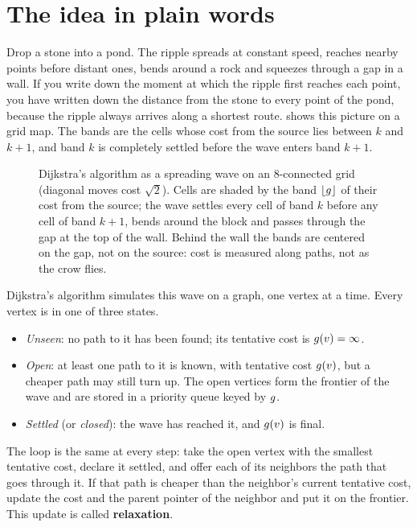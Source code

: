 \section{The idea in plain words}
\label{sec:ch03-intuition}

Drop a stone into a pond. The ripple spreads at constant speed, reaches nearby points before
distant ones, bends around a rock and squeezes through a gap in a wall. If you write down the
moment at which the ripple first reaches each point, you have written down the distance from the
stone to every point of the pond, because the ripple always arrives along a shortest route.
 shows this picture on a grid map. The bands are the cells whose cost
from the source lies between $k$ and $k+1$, and band $k$ is completely settled before the wave
enters band $k+1$.

\begin{figure}[tb]
  \centering
  \caption{Dijkstra's algorithm as a spreading wave on an 8-connected grid (diagonal moves cost
$\sqrt2$). Cells are shaded by the band $\lfloor g\rfloor$ of their cost from the source;
the wave settles every cell of band $k$ before any cell of band $k+1$, bends around the block
and passes through the gap at the top of the wall. Behind the wall the bands are centered on the
gap, not on the source: cost is measured along paths, not as the crow flies.}
  \label{fig:ch03-wavefront}
\end{figure}

Dijkstra's algorithm simulates this wave on a graph, one vertex at a
time. Every vertex is in one of three states.
\begin{itemize}
  \item \emph{Unseen}: no path to it has been found; its tentative cost is $g(v)=\infty$.
  \item \emph{Open}: at least one path to it is known, with tentative cost $g(v)$, but a
cheaper path may still turn up. The open vertices form the frontier of the wave and are stored
in a priority queue keyed by $g$.
  \item \emph{Settled} (or \emph{closed}): the wave has reached it, and $g(v)$ is final.
\end{itemize}
The loop is the same at every step: take the open vertex with the smallest tentative cost,
declare it settled, and offer each of its neighbors the path that goes through it. If that path
is cheaper than the neighbor's current tentative cost, update the cost and the parent pointer
of the neighbor and put it on the frontier. This update is called
\textbf{relaxation}.

